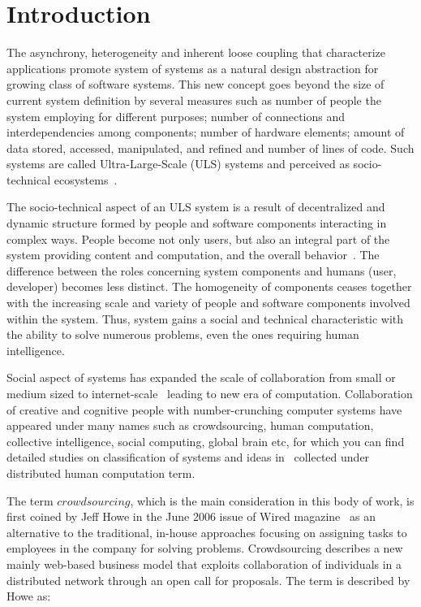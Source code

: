 \chapter{Introduction} 


The asynchrony, heterogeneity and inherent loose coupling that characterize applications 
promote system of systems as a natural design abstraction for growing class of software 
systems. This new concept goes beyond the size of current system definition by several 
measures such as 
number of people the system employing for different purposes; 
number of connections and interdependencies among components; 
number of hardware elements; 
amount of data stored, accessed, manipulated, and refined 
and number of lines of code. Such systems are called 
Ultra-Large-Scale (ULS) systems and perceived as socio-technical 
ecosystems~\cite{ULSReport}.

The socio-technical aspect of an ULS system is a result of decentralized and dynamic 
structure formed by people and software components interacting in complex ways. 
People become not only users, but also an integral part of the system providing 
content and computation, and the overall behavior~\cite{ULSReport}. 
The difference between the roles concerning system components and 
humans (user, developer) becomes less distinct. The homogeneity 
of components ceases together with the increasing scale and variety of people 
and software components involved within the system. Thus, system gains a social 
and technical characteristic with the ability to solve numerous problems, 
even the ones requiring human intelligence.

Social aspect of systems has expanded the scale of collaboration from small or 
medium sized to internet-scale~\cite{Dorn2012b} leading to new era of computation. 
Collaboration of creative and cognitive people with number-crunching 
computer systems have appeared under many names such as crowdsourcing, 
human computation, collective intelligence, social computing, global brain etc, 
for which you can find detailed studies on classification of systems and ideas 
in~\cite{Quinn2009, Quinn2011} collected under distributed human computation term.

The term $crowdsourcing$, which is the main consideration in this body of work, 
is first coined by Jeff Howe in the June 2006 issue of Wired magazine~\cite{Howe2006b} 
as an alternative to the traditional, in-house approaches focusing on assigning tasks 
to employees in the company for solving problems. Crowdsourcing describes a new 
mainly web-based business model that exploits collaboration of individuals in a 
distributed network through an open call for proposals. The term is described by Howe as:


